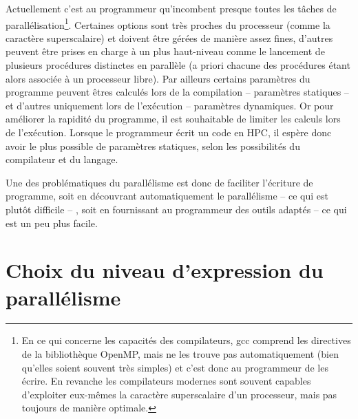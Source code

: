 Actuellement c'est au programmeur qu'incombent presque toutes les tâches de parallélisation\footnote{En ce qui concerne les capacités des compilateurs, \textsf{gcc} comprend les directives de la bibliothèque \textsf{OpenMP}, mais ne les trouve pas automatiquement (bien qu'elles soient souvent très simples) et c'est donc au programmeur de les écrire. En revanche les compilateurs modernes sont souvent capables d'exploiter eux-mêmes la caractère superscalaire d'un processeur, mais pas toujours de manière optimale.}. %
Certaines options sont très proches du processeur (comme la caractère superscalaire) et doivent être gérées de manière assez fines, d'autres peuvent être prises en charge à un plus haut-niveau comme le lancement de plusieurs procédures distinctes en parallèle (a priori chacune des procédures étant alors associée à un processeur libre). %
Par ailleurs certains paramètres du programme peuvent êtres calculés lors de la compilation -- paramètres statiques -- et d'autres uniquement lors de l'exécution -- paramètres dynamiques. Or pour améliorer la rapidité du programme, il est souhaitable de limiter les calculs lors de l'exécution. Lorsque le programmeur écrit un code en HPC, il espère donc avoir le plus possible de paramètres statiques, selon les possibilités du compilateur et du langage. 

Une des problématiques du parallélisme est donc de faciliter l'écriture de programme, soit en découvrant automatiquement le parallélisme -- ce qui est plutôt difficile -- , soit en fournissant au programmeur des outils adaptés -- ce qui est un peu plus facile.

\section{Choix du niveau d'expression du parallélisme}


